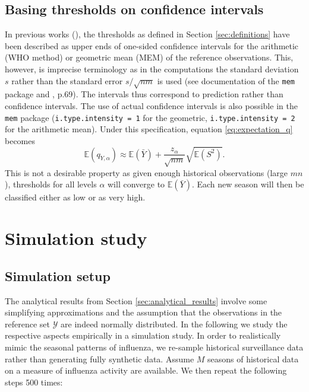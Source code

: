 \documentclass{article}
\newcommand{\sd}{s}
\begin{document}
\subsection{Basing thresholds on confidence intervals}
\label{subsec:cis}

In previous works (\citealt{WHO2014, Vega2015}), the thresholds as defined in Section \ref{sec:definitions} have been described as upper ends of one-sided confidence intervals for the arithmetic (WHO method) or geometric mean (MEM) of the reference observations. This, however, is imprecise terminology as in the computations the standard deviation $\sd$ rather than the standard error $\sd/\sqrt{nm}$ is used (see documentation of the \texttt{mem} package and \citealt{WHO2014}, p.69). The intervals thus correspond to prediction rather than confidence intervals. The use of actual confidence intervals is also possible in the \texttt{mem} package (\texttt{i.type.intensity = 1} for the geometric, \texttt{i.type.intensity = 2} for the arithmetic mean). Under this specification, equation \eqref{eq:expectation_q} becomes
$$
\mathbb{E}(q_{Y, \alpha}) \approx \mathbb{E}(\bar{Y}) + \frac{z_\alpha}{\sqrt{nm}} \sqrt{\mathbb{E}(S^2)}.
$$
This is not a desirable property as given enough historical observations (large $mn$), thresholds for all levels $\alpha$ will converge to $\mathbb{E}(\bar{Y})$. Each new season will then be classified either as low or as very high.

\section{Simulation study}
\label{sec:simulation}

\subsection{Simulation setup}
\label{subsec:simulation_setup}

The analytical results from Section \ref{sec:analytical_results} involve some simplifying approximations and the assumption that the observations in the reference set $\mathcal{Y}$ are indeed normally distributed. In the following we study the respective aspects empirically in a simulation study. In order to realistically mimic the seasonal patterns of influenza, we re-sample historical surveillance data rather than generating fully synthetic data. Assume $M$ seasons of historical data on a measure of influenza activity are available. We then repeat the following steps 500 times:
\end{document}
